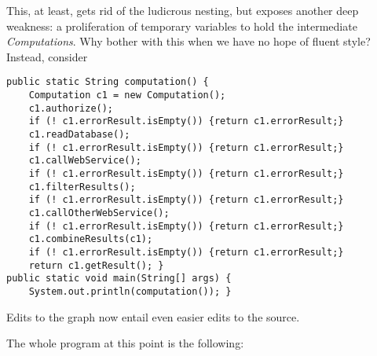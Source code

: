 \documentclass[11pt]{article}
\begin{document}
This, at least, gets rid of the ludicrous nesting, but exposes another
deep weakness: a proliferation of temporary variables to hold the
intermediate \emph{Computations}. Why bother with this when we have no hope
of fluent style? Instead, consider
\begin{verbatim}
public static String computation() {
    Computation c1 = new Computation();
    c1.authorize();
    if (! c1.errorResult.isEmpty()) {return c1.errorResult;}
    c1.readDatabase();
    if (! c1.errorResult.isEmpty()) {return c1.errorResult;}
    c1.callWebService();
    if (! c1.errorResult.isEmpty()) {return c1.errorResult;}
    c1.filterResults();
    if (! c1.errorResult.isEmpty()) {return c1.errorResult;}
    c1.callOtherWebService();
    if (! c1.errorResult.isEmpty()) {return c1.errorResult;}
    c1.combineResults(c1);
    if (! c1.errorResult.isEmpty()) {return c1.errorResult;}
    return c1.getResult(); }
public static void main(String[] args) {
    System.out.println(computation()); }
\end{verbatim}
Edits to the graph now entail even easier edits to the source.

The whole program at this point is the following:
\end{document}
